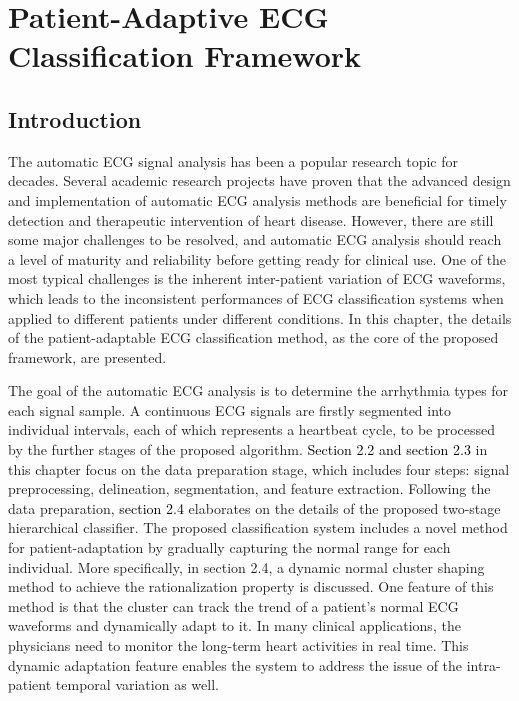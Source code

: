 \chapter{Patient-Adaptive ECG Classification Framework}

\section{Introduction}
The automatic ECG signal analysis has been a popular research topic for decades. Several academic research projects have proven that the advanced design and implementation of automatic ECG analysis methods are beneficial for timely detection and therapeutic intervention of heart disease. However, there are still some major challenges to be resolved, and automatic ECG analysis should reach a level of maturity and reliability before getting ready for clinical use. One of the most typical challenges is the inherent inter-patient variation of ECG waveforms, which leads to the inconsistent performances of ECG classification systems when applied to different patients under different conditions. In this chapter, the details of the patient-adaptable ECG classification method, as the core of the proposed framework, are presented.

The goal of the automatic ECG analysis is to determine the arrhythmia types for each signal sample. A continuous ECG signals are firstly segmented into individual intervals, each of which represents a heartbeat cycle, to be processed by the further stages of the proposed algorithm. \textcolor{black}{Section 2.2 and section 2.3} in this chapter focus on the data preparation stage, which includes four steps: signal preprocessing, delineation, segmentation, and feature extraction. Following the data preparation, \textcolor{black}{section 2.4} elaborates on the details of the proposed two-stage hierarchical classifier. The proposed classification system includes a novel method for patient-adaptation by gradually capturing the normal range for each individual. More specifically, in section 2.4, a dynamic normal cluster shaping method to achieve the rationalization property is discussed. One feature of this method is that the cluster can track the trend of a patient's normal ECG waveforms and dynamically adapt to it. In many clinical applications, the physicians need to monitor the long-term heart activities in real time. This dynamic adaptation feature enables the system to address the issue of the intra-patient temporal variation as well.

